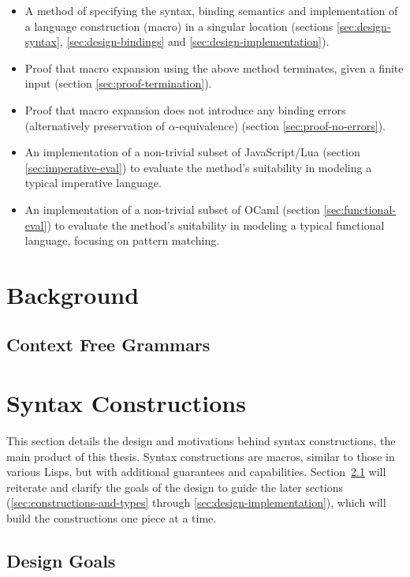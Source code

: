 \documentclass{kththesis}
\begin{document}
\begin{itemize}
  \item A method of specifying the syntax, binding semantics and implementation of a language construction (macro) in a singular location (sections \ref{sec:design-syntax}, \ref{sec:design-bindings} and \ref{sec:design-implementation}).
  \item Proof that macro expansion using the above method terminates, given a finite input (section \ref{sec:proof-termination}).
  \item Proof that macro expansion does not introduce any binding errors (alternatively preservation of $\alpha$-equivalence) (section \ref{sec:proof-no-errors}).
  \item An implementation of a non-trivial subset of JavaScript/Lua (section \ref{sec:imperative-eval}) to evaluate the method's suitability in modeling a typical imperative language.
  \item An implementation of a non-trivial subset of OCaml (section \ref{sec:functional-eval}) to evaluate the method's suitability in modeling a typical functional language, focusing on pattern matching.
\end{itemize}

\chapter{Background}

\section{Context Free Grammars}

\chapter{Syntax Constructions}

This section details the design and motivations behind syntax constructions, the main product of this thesis. Syntax constructions are macros, similar to those in various Lisps, but with additional guarantees and capabilities. Section~\ref{sec:design-goals} will reiterate and clarify the goals of the design to guide the later sections (\ref{sec:constructions-and-types} through \ref{sec:design-implementation}), which will build the constructions one piece at a time.

\section{Design Goals} \label{sec:design-goals}
\end{document}
